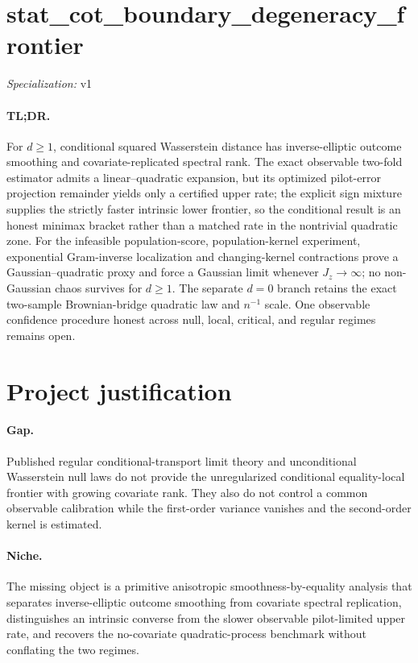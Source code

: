 \documentclass{article}
\begin{document}
\sloppy

\section*{stat\_\allowbreak{}cot\_\allowbreak{}boundary\_\allowbreak{}degeneracy\_\allowbreak{}frontier}

\noindent\textit{Specialization:} v1\par

\paragraph{TL;DR.} For \(d\ge1\), conditional squared Wasserstein distance has inverse-elliptic outcome smoothing and covariate-replicated spectral rank. The exact observable two-fold estimator admits a linear--quadratic expansion, but its optimized pilot-error projection remainder yields only a certified upper rate; the explicit sign mixture supplies the strictly faster intrinsic lower frontier, so the conditional result is an honest minimax bracket rather than a matched rate in the nontrivial quadratic zone. For the infeasible population-score, population-kernel experiment, exponential Gram-inverse localization and changing-kernel contractions prove a Gaussian--quadratic proxy and force a Gaussian limit whenever \(J_z\to\infty\); no non-Gaussian chaos survives for \(d\ge1\). The separate \(d=0\) branch retains the exact two-sample Brownian-bridge quadratic law and \(n^{-1}\) scale. One observable confidence procedure honest across null, local, critical, and regular regimes remains open.

\section{Project justification}

\paragraph{Gap.} Published regular conditional-transport limit theory and unconditional Wasserstein null laws do not provide the unregularized conditional equality-local frontier with growing covariate rank. They also do not control a common observable calibration while the first-order variance vanishes and the second-order kernel is estimated.

\paragraph{Niche.} The missing object is a primitive anisotropic smoothness-by-equality analysis that separates inverse-elliptic outcome smoothing from covariate spectral replication, distinguishes an intrinsic converse from the slower observable pilot-limited upper rate, and recovers the no-covariate quadratic-process benchmark without conflating the two regimes.
\end{document}
